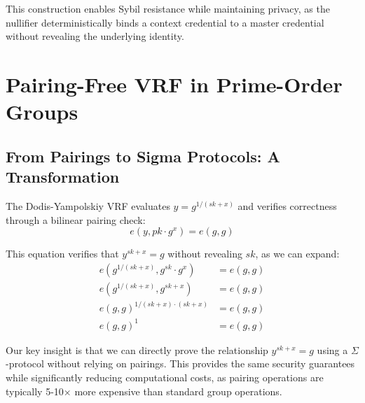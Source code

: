This construction enables Sybil resistance while maintaining privacy, as the nullifier deterministically binds a context credential to a master credential without revealing the underlying identity.











































\section{Pairing-Free VRF in Prime-Order Groups}

\subsection{From Pairings to Sigma Protocols: A Transformation}

The Dodis-Yampolskiy VRF \cite{hutchison_verifiable_2005} evaluates $y = g^{1/(sk+x)}$ and verifies correctness through a bilinear pairing check:
\begin{equation}
e(y, pk \cdot g^x) = e(g, g)
\end{equation}

This equation verifies that $y^{sk+x} = g$ without revealing $sk$, as we can expand:
\begin{align}
e(g^{1/(sk+x)}, g^{sk} \cdot g^x) &= e(g, g)\\
e(g^{1/(sk+x)}, g^{sk+x}) &= e(g, g)\\
e(g, g)^{1/(sk+x) \cdot (sk+x)} &= e(g, g)\\
e(g, g)^1 &= e(g, g)
\end{align}

Our key insight is that we can directly prove the relationship $y^{sk+x} = g$ using a $\Sigma$-protocol without relying on pairings. This provides the same security guarantees while significantly reducing computational costs, as pairing operations are typically 5-10× more expensive than standard group operations.

